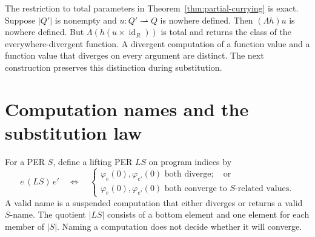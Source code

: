 \documentclass[11pt]{article}
\theoremstyle{definition}
\newcommand{\id}{\operatorname{id}}
\begin{document}
The restriction to total parameters in Theorem~\ref{thm:partial-currying}
is exact. Suppose $|Q'|$ is nonempty and
$u:Q'\rightharpoonup Q$ is nowhere defined. Then
$(\Lambda h)u$ is nowhere defined. But
$\Lambda(h(u\times\id_R))$ is total and returns the class of the
everywhere-divergent function. A divergent computation of a function
value and a function value that diverges on every argument are distinct.
The next construction preserves this distinction during substitution.

\section{Computation names and the substitution law}\label{sec:lift}

For a PER $S$, define a lifting PER $LS$ on program indices by
\[
 e\,(LS)\,e'\quad\Longleftrightarrow\quad
 \begin{cases}
 \varphi_e(0),\varphi_{e'}(0)\text{ both diverge};\quad\text{or}\\
 \varphi_e(0),\varphi_{e'}(0)\text{ both converge to $S$-related values}.
 \end{cases}
\]
A valid name is a suspended computation that either diverges or returns
a valid $S$-name. The quotient $|LS|$ consists of a bottom element and
one element for each member of $|S|$. Naming a computation does not
decide whether it will converge.
\end{document}
